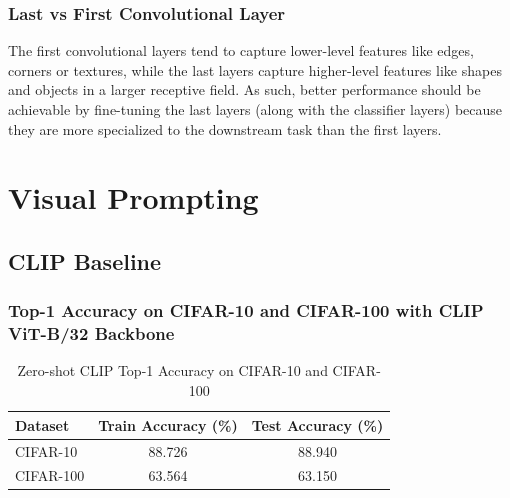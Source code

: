 \documentclass[a4paper]{article}
\begin{document}
\subsubsection{Last vs First Convolutional Layer}
The first convolutional layers tend to capture lower-level features like edges, corners or textures, while the last
layers capture higher-level features like shapes and objects in a larger receptive field. As such, better performance
should be achievable by fine-tuning the last layers (along with the classifier layers) because they are more
specialized to the downstream task than the first layers.
\bigskip

\section{Visual Prompting}
\subsection{CLIP Baseline}
\subsubsection{Top-1 Accuracy on CIFAR-10 and CIFAR-100 with CLIP ViT-B/32 Backbone}
\begin{table}[h]
    \centering
    \begin{tabular}{|l|c|c|}
    \hline
    \textbf{Dataset} & \textbf{Train Accuracy (\%)} & \textbf{Test Accuracy (\%)} \\ \hline
    CIFAR-10 & 88.726 & 88.940 \\ \hline
    CIFAR-100 & 63.564 & 63.150 \\ \hline
    \end{tabular}
    \caption{Zero-shot CLIP Top-1 Accuracy on CIFAR-10 and CIFAR-100}
    \label{tab:clip_accuracy}
\end{table}
\end{document}
